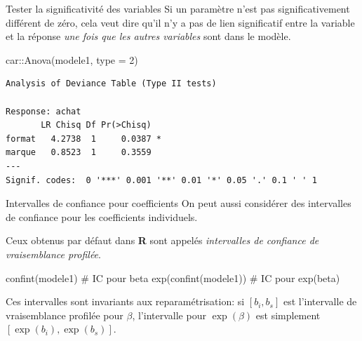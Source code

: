 \documentclass[
  ignorenonframetext,
]{beamer}
\newenvironment{Shaded}{\begin{snugshade}}{\end{snugshade}}
\newcommand{\AttributeTok}[1]{\textcolor[rgb]{0.40,0.45,0.13}{#1}}
\newcommand{\CommentTok}[1]{\textcolor[rgb]{0.37,0.37,0.37}{#1}}
\newcommand{\DecValTok}[1]{\textcolor[rgb]{0.68,0.00,0.00}{#1}}
\newcommand{\FunctionTok}[1]{\textcolor[rgb]{0.28,0.35,0.67}{#1}}
\newcommand{\NormalTok}[1]{\textcolor[rgb]{0.00,0.23,0.31}{#1}}
\newcommand{\SpecialCharTok}[1]{\textcolor[rgb]{0.37,0.37,0.37}{#1}}
\begin{document}
\begin{frame}[fragile]{Tester la significativité des variables}
\protect{}\label{tester-la-significativituxe9-des-variables}
Si un paramètre n'est pas significativement différent de zéro, cela veut
dire qu'il n'y a pas de lien significatif entre la variable et la
réponse \emph{une fois que les autres variables} sont dans le modèle.

\footnotesize

\begin{Shaded}
\begin{Highlighting}[numbers=left,,]
\NormalTok{car}\SpecialCharTok{::}\FunctionTok{Anova}\NormalTok{(modele1, }\AttributeTok{type =} \DecValTok{2}\NormalTok{)}
\end{Highlighting}
\end{Shaded}

\begin{verbatim}
Analysis of Deviance Table (Type II tests)

Response: achat
       LR Chisq Df Pr(>Chisq)  
format   4.2738  1     0.0387 *
marque   0.8523  1     0.3559  
---
Signif. codes:  0 '***' 0.001 '**' 0.01 '*' 0.05 '.' 0.1 ' ' 1
\end{verbatim}

\normalsize
\end{frame}

\begin{frame}[fragile]{Intervalles de confiance pour coefficients}
\protect{}\label{intervalles-de-confiance-pour-coefficients}
On peut aussi considérer des intervalles de confiance pour les
coefficients individuels.

Ceux obtenus par défaut dans \textbf{R} sont appelés \emph{intervalles
de confiance de vraisemblance profilée}.

\begin{Shaded}
\begin{Highlighting}[numbers=left,,]
\FunctionTok{confint}\NormalTok{(modele1)      }\CommentTok{\# IC pour beta}
\FunctionTok{exp}\NormalTok{(}\FunctionTok{confint}\NormalTok{(modele1)) }\CommentTok{\# IC pour exp(beta)}
\end{Highlighting}
\end{Shaded}

Ces intervalles sont invariants aux reparamétrisation: si \([b_i, b_s]\)
est l'intervalle de vraisemblance profilée pour \(\beta\), l'intervalle
pour \(\exp(\beta)\) est simplement \([\exp(b_i), \exp(b_s)]\).
\end{frame}
\end{document}
